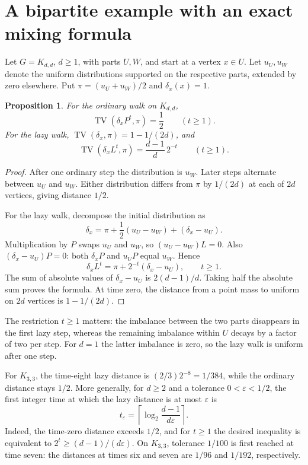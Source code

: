 \documentclass[11pt,letterpaper]{article}
\newtheorem{proposition}{Proposition}
\newcommand{\TV}{\operatorname{TV}}
\begin{document}
\newpage
\section{A bipartite example with an exact mixing formula}
Let $G=K_{d,d}$, $d\ge1$, with parts $U,W$, and start at a vertex $x\in U$.
Let $u_U,u_W$ denote the uniform distributions supported on the respective
parts, extended by zero elsewhere. Put
$\pi=(u_U+u_W)/2$ and $\delta_x(x)=1$.

\begin{proposition}\label{prop:bipartite}
For the ordinary walk on $K_{d,d}$,
\[
 \TV(\delta_xP^t,\pi)=\frac12 \qquad(t\ge1).
\]
For the lazy walk, $\TV(\delta_x,\pi)=1-1/(2d)$, and
\[
 \TV(\delta_xL^t,\pi)=\frac{d-1}{d}\,2^{-t}
 \qquad(t\ge1).
\]
\end{proposition}
\begin{proof}
After one ordinary step the distribution is $u_W$. Later steps alternate
between $u_U$ and $u_W$. Either distribution differs from $\pi$ by
$1/(2d)$ at each of $2d$ vertices, giving distance $1/2$.

For the lazy walk, decompose the initial distribution as
\[
 \delta_x=\pi+\frac12(u_U-u_W)+(\delta_x-u_U).
\]
Multiplication by $P$ swaps $u_U$ and $u_W$, so
$(u_U-u_W)L=0$. Also $(\delta_x-u_U)P=0$: both $\delta_xP$
and $u_UP$ equal $u_W$. Hence
\[
 \delta_xL^t=\pi+2^{-t}(\delta_x-u_U),\qquad t\ge1.
\]
The sum of absolute values of $\delta_x-u_U$ is $2(d-1)/d$.
Taking half the absolute sum proves the formula. At time zero, the distance
from a point mass to uniform on $2d$ vertices is $1-1/(2d)$.
\end{proof}

The restriction $t\ge1$ matters: the imbalance between the two parts
disappears in the first lazy step, whereas the remaining imbalance within
$U$ decays by a factor of two per step. For $d=1$ the latter imbalance is
zero, so the lazy walk is uniform after one step.

For $K_{3,3}$, the time-eight lazy distance is
$(2/3)2^{-8}=1/384$, while the ordinary distance stays $1/2$.
More generally, for $d\ge2$ and a tolerance $0<\varepsilon<1/2$, the first
integer time at which the lazy distance is at most $\varepsilon$ is
\[
 t_\varepsilon=\left\lceil\log_2\frac{d-1}{d\varepsilon}\right\rceil.
\]
Indeed, the time-zero distance exceeds $1/2$, and for $t\ge1$ the desired
inequality is equivalent to $2^t\ge(d-1)/(d\varepsilon)$.
On $K_{3,3}$, tolerance $1/100$ is first reached at time seven:
the distances at times six and seven are $1/96$ and $1/192$, respectively.
\end{document}
